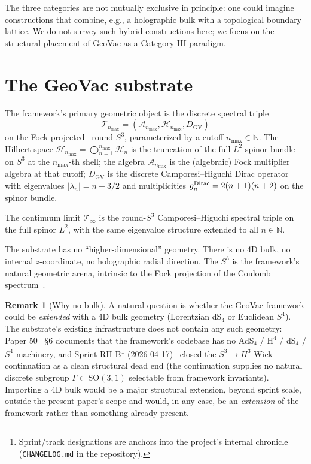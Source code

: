 \documentclass[11pt,a4paper]{article}
\theoremstyle{plain}
\theoremstyle{definition}
\newtheorem{remark}[theorem]{Remark}
\newcommand{\nmax}{n_{\max}}
\newcommand{\sthree}{S^{3}}
\newcommand{\Hilb}{\mathcal{H}}
\newcommand{\Acal}{\mathcal{A}}
\newcommand{\Tcal}{\mathcal{T}}
\newcommand{\N}{\mathbb{N}}
\newcommand{\DGV}{D_{\mathrm{GV}}}
\begin{document}
The three categories are not mutually exclusive in principle: one
could imagine constructions that combine, e.g., a holographic bulk
with a topological boundary lattice. We do not survey such hybrid
constructions here; we focus on the structural placement of GeoVac
as a Category III paradigm.

\section{The GeoVac substrate}
\label{sec:geovac_substrate}

The framework's primary geometric object is the discrete spectral
triple
\begin{equation}
\Tcal_{\nmax} = (\Acal_{\nmax}, \Hilb_{\nmax}, \DGV)
\label{eq:geovac_triple}
\end{equation}
on the Fock-projected~\cite{paper7} round $\sthree$, parameterized by
a cutoff $\nmax \in \N$. The Hilbert space
$\Hilb_{\nmax} = \bigoplus_{n=1}^{\nmax} \Hilb_{n}$ is the truncation
of the full $L^{2}$ spinor bundle on $\sthree$ at the $\nmax$-th
shell; the algebra $\Acal_{\nmax}$ is the (algebraic) Fock multiplier
algebra at that cutoff; $\DGV$ is the discrete Camporesi--Higuchi
Dirac operator with eigenvalues $|\lambda_{n}| = n + 3/2$ and
multiplicities $g_{n}^{\rm Dirac} = 2(n+1)(n+2)$ on the spinor bundle.

The continuum limit $\Tcal_{\infty}$ is the round-$\sthree$
Camporesi--Higuchi spectral triple on the full spinor $L^{2}$, with
the same eigenvalue structure extended to all $n \in \N$.

The substrate has no ``higher-dimensional'' geometry. There is no
4D bulk, no internal $z$-coordinate, no holographic radial direction.
The $\sthree$ is the framework's natural geometric arena, intrinsic to
the Fock projection of the Coulomb spectrum~\cite{paper7}.

\begin{remark}[Why no bulk]
\label{rem:no_bulk}
A natural question is whether the GeoVac framework could be
\emph{extended} with a 4D bulk geometry (Lorentzian dS$_{4}$ or
Euclidean $S^{4}$). The substrate's existing infrastructure does not
contain any such geometry: Paper 50~\cite{paper50} \S 6 documents that
the framework's codebase has no AdS$_{4}$ / H$^{4}$ / dS$_{4}$ / $S^{4}$
machinery, and Sprint RH-B\footnote{Sprint/track designations are anchors into the project's internal chronicle (\texttt{CHANGELOG.md} in the repository).} (2026-04-17)~\cite{paper29} closed the
$\sthree \to H^{3}$ Wick continuation as a clean structural dead end
(the continuation supplies no natural discrete subgroup
$\Gamma \subset \mathrm{SO}(3, 1)$ selectable from framework
invariants). Importing a 4D bulk would be a major structural
extension, beyond sprint scale, outside the present paper's scope and would, in any case,
be an \emph{extension} of the framework rather than something
already present.
\end{remark}
\end{document}
